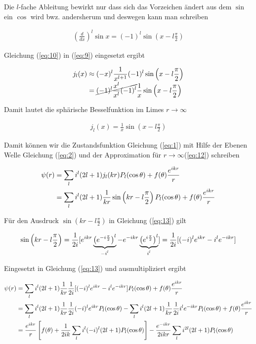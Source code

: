 Die \(l\)-fache Ableitung bewirkt nur dass sich das Vorzeichen ändert aus dem \(\sin\) ein \(\cos\) wird bwz. andersherum und deswegen kann man schreiben

\begin{align}
  \label{eq:10}
  \left( \frac{d}{dx}\right)^l \sin x = (-1)^l\sin\left(x - l\frac{\pi}{2}\right)
\end{align}

Gleichung (\ref{eq:10}) in (\ref{eq:9}) eingesetzt ergibt

\begin{align}
  \label{eq:11}
   j_l(x) &\approx (-x)^l\frac{1}{x^{l+1}} (-1)^l\sin\left(x - l\frac{\pi}{2}\right) \notag \\
&= \cancel{(-1)^l \frac{x^l}{x^l}(-1)^l}\frac{1}{x}\sin\left(x - l\frac{\pi}{2}\right)\notag \\
\end{align}

Damit lautet die sphärische Besselfunktion im Limes \(r\to\infty\)

\begin{align}
  \label{eq:12}
   j_l(x) = \frac{1}{x}\sin\left(x - l\frac{\pi}{2}\right)
\end{align}

Damit können wir die Zustandsfunktion Gleichung (\ref{eq:1}) mit Hilfe der Ebenen Welle Gleichung (\ref{eq:2}) und der Approximation für \(r\to\infty\)(\ref{eq:12}) schreiben

\begin{align}
  \label{eq:13}
  \psi(r) &= \sum_{l}i^l(2l+1)j_l(kr)P_l(\cos\theta) + f(\theta)\frac{e^{i k r}}{r}\notag \\
&= \sum_{l}i^l(2l+1) \frac{1}{kr}\sin\left(kr - l\frac{\pi}{2}\right)P_l(\cos\theta) + f(\theta)\frac{e^{i k r}}{r}
\end{align}

Für den Ausdruck \(\sin\left(kr - l\frac{\pi}{2}\right) \) in Gleichung (\ref{eq:13}) gilt

\begin{align}
  \label{eq:14}
  \sin\left(kr - l\frac{\pi}{2}\right) = \frac{1}{2i}[ e^{ikr}\underbr{\left( e^{-i\frac{\pi}{2}}\right)^l}_{-i^l} - e^{-ikr}\underbr{\left(e^{i\frac{\pi}{2}}\right)^l}_{i^l}] = \frac{1}{2i}[ (-i)^l e^{ikr} - i^l e^{-ikr} ]
\end{align}

Eingesetzt in Gleichung (\ref{eq:13}) und ausmultipliziert ergibt

\begin{align}
  \label{eq:15}
 \psi(r) &= \sum_{l}i^l(2l+1) \frac{1}{kr}  \frac{1}{2i}[ (-i)^l e^{ikr} - i^l e^{-ikr} ] P_l(\cos\theta) + f(\theta)\frac{e^{i k r}}{r} \notag \\
&=  \sum_{l}i^l(2l+1) \frac{1}{kr}  \frac{1}{2i} (-i)^l e^{ikr}P_l(\cos\theta) - \sum_{l}i^l(2l+1)\frac{1}{kr}  \frac{1}{2i} i^l e^{-ikr}  P_l(\cos\theta) + f(\theta)\frac{e^{i k r}}{r} \notag \\
&= \frac{e^{i k r}}{r}\left[f(\theta) +  \frac{1}{2ik} \sum_{l}i^l(-i)^l(2l+1) P_l(\cos\theta)\right]  -  \frac{e^{-ikr}}{2ikr} \sum_{l}i^{2l}(2l+1) P_l(\cos\theta)
\end{align}

